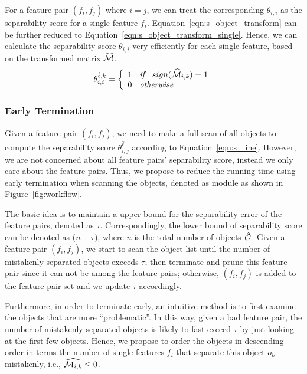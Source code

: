  For a feature pair $(f_i,f_j)$ where $i=j$, we can treat the corresponding $\theta_{i,i}$ as the separability score for a single feature $f_i$. Equation~\ref{eqn:s_object_transform} can be further reduced to Equation~\ref{eqn:s_object_transform_single}. Hence, we can calculate the separability score $\theta_{i,i}$ very efficiently for each single feature, based on the transformed matrix $\widehat{\mm}$.
\begin{equation}\label{eqn:s_object_transform_single}
\theta_{i,i}^{\hat{\ell},k}=\left\{
                \begin{array}{ll}
                  1 \textit{\hspace{2mm} if \hspace{2mm}} sign(\widehat{\mm}_{i,k}) = 1\\
                  0 \textit{\hspace{2mm} otherwise \hspace{2mm}} 
                \end{array}
              \right.
\end{equation}


\subsubsection{Early Termination} \label{ssec:earlyT}
Given a feature pair $(f_i,f_j)$, we need to make a full scan of all objects to compute the separability score $\theta_{i,j}^{\hat{\ell}}$ according to Equation~\ref{eqn:s_line}. However, we are not concerned about all feature pairs' separability score, instead we only care about the \topk feature pairs. Thus, we propose to reduce the running time using early termination when scanning the objects, denoted as \earlyT module as shown in Figure~\ref{fig:workflow}.

 The basic idea is to maintain a upper bound for the separability error of the \topk feature pairs, denoted as $\tau$. Correspondingly, the lower bound of separability score can be denoted as ($n-\tau$), where $n$ is the total number of objects $\hat{\oo}$. Given a feature pair $(f_i,f_j)$, we start to scan the object list until the number of mistakenly separated objects exceeds $\tau$, then terminate and prune this feature pair since it can not be among the \topk feature pairs; otherwise, $(f_i,f_j)$ is added to the \topk feature pair set and we update $\tau$ accordingly.

 Furthermore, in order to terminate early, an intuitive method is to first examine the objects that are more ``problematic''. In this way, given a bad feature pair, the number of mistakenly separated objects is likely to fast exceed $\tau$ by just looking at the first few objects. Hence, we propose to order the objects in descending order in terms the number of single features $f_i$ that separate this object $o_k$ mistakenly, i.e., $\widehat{\mm_{i,k}}\leq0$.

